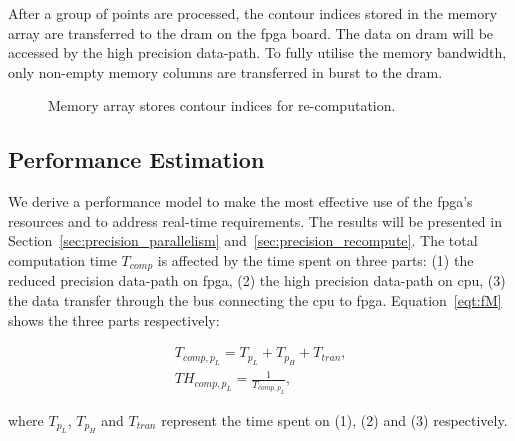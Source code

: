 After a group of points are processed, the contour indices stored in the memory array are transferred to the \gls{dram} on the \gls{fpga} board.
The data on \gls{dram} will be accessed by the high precision data-path.
To fully utilise the memory bandwidth, only non-empty memory columns are transferred in burst to the \gls{dram}.

\setcounter{subfigure}{0}
\begin{figure}[t!]
\centering
{}
\caption{Memory array stores contour indices for re-computation.}
\label{fig:memory}
\end{figure}

\subsection{Performance Estimation}
\label{sec:precision_model}

We derive a performance model to make the most effective use of the \gls{fpga}'s resources and to address real-time requirements.
The results will be presented in Section~\ref{sec:precision_parallelism} and~\ref{sec:precision_recompute}.
The total computation time $T_{comp}$ is affected by the time spent on three parts:
(1) the reduced precision data-path on \gls{fpga},
(2) the high precision data-path on \gls{cpu},
(3) the data transfer through the bus connecting the \gls{cpu} to \gls{fpga}.
Equation~\ref{eqt:fM} shows the three parts respectively:

\begin{equation}
\begin{aligned}
T_{comp,p_L} = T_{p_L} + T_{p_H} + T_{tran} \mbox{,} \\
TH_{comp,p_L} = \frac{1}{T_{comp,p_L}} \mbox{,}
\end{aligned}
\label{eqt:fM}
\end{equation}

where $T_{p_L}$, $T_{p_H}$ and $T_{tran}$ represent the time spent on (1), (2) and (3) respectively.

